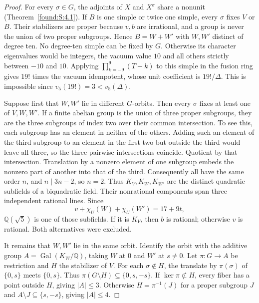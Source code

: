 \documentclass[11pt,a4paper]{article}
\numberwithin{equation}{section}
\theoremstyle{remark}
\newcommand{\Gal}{\operatorname{Gal}}
\newcommand{\QQ}{\mathbb Q}
\begin{document}
\begin{proof}
For every $\sigma\in G$, the adjoints of $X$ and $X^\sigma$ share a nonunit (Theorem~\ref{found:S:4.1}). If $B$ is one simple or twice
one simple, every $\sigma$ fixes $V$ or $B$. Their stabilizers are
proper because $v,b$ are irrational, and a group is never the union
of two proper subgroups. Hence $B=W+W'$ with $W,W'$ distinct of
degree ten. No degree-ten simple can be fixed by $G$. Otherwise its
character eigenvalues would be integers, the vacuum value $10$ and
all others strictly between $-10$ and $10$. Applying
$\prod_{k=-9}^9(T-k)$ to this simple in the fusion ring gives $19!$
times the vacuum idempotent, whose unit coefficient is $19!/\Delta$.
This is impossible since $v_5(19!)=3<v_5(\Delta)$.

Suppose first that $W,W'$ lie in different $G$-orbits. Then every
$\sigma$ fixes at least one of $V,W,W'$. If a finite abelian group
is the union of three proper subgroups, they are the three subgroups
of index two over their common intersection. To see this, each
subgroup has an element in neither of the others. Adding such an element
of the third subgroup to an element in the first two but outside the third
would leave all three, so the three pairwise intersections coincide.
Quotient by that intersection. Translation by a nonzero element of one
subgroup embeds the nonzero part of another into that of the third.
Consequently all have the same order $n$, and $n\mid 3n-2$, so $n=2$.
Thus $K_V,K_W,K_{W'}$ are the distinct quadratic subfields of a
biquadratic field. Their nonrational components span three independent
rational lines. Since
\[
      v+\chi_U(W)+\chi_U(W')=17+9t ,
\]
$\QQ(\sqrt5)$ is one of those subfields. If it is $K_V$, then $b$ is
rational; otherwise $v$ is rational. Both alternatives were excluded.

It remains that $W,W'$ lie in the same orbit. Identify the orbit
with the additive group $A=\Gal(K_W/\QQ)$, taking $W$ at $0$ and
$W'$ at $s\ne0$. Let $\pi:G\to A$ be restriction and $H$ the
stabilizer of $V$. For each $\sigma\notin H$, the translate by
$\pi(\sigma)$ of $\{0,s\}$ meets $\{0,s\}$. Thus
$\pi(G\setminus H)\subseteq\{0,s,-s\}$. If $\ker\pi\not\subset H$,
every fiber has a point outside $H$, giving $|A|\le3$. Otherwise
$H=\pi^{-1}(J)$ for a proper subgroup $J$ and
$A\setminus J\subseteq\{s,-s\}$, giving $|A|\le4$.


\end{proof}
\end{document}
